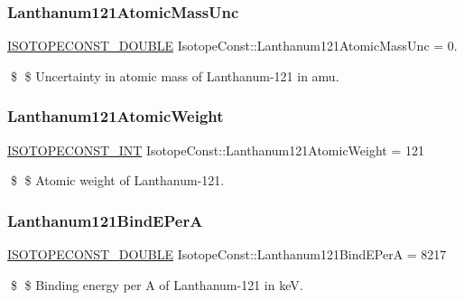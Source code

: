 \subsubsection{\texorpdfstring{Lanthanum121\+Atomic\+Mass\+Unc}{Lanthanum121AtomicMassUnc}}
{\footnotesize\ttfamily \mbox{\hyperlink{group___isotope_const-_macros_ga8f45a7272ce02c0b4c65c44636ed719a}{I\+S\+O\+T\+O\+P\+E\+C\+O\+N\+S\+T\+\_\+\+D\+O\+U\+B\+LE}} Isotope\+Const\+::\+Lanthanum121\+Atomic\+Mass\+Unc = 0.}

\$ \$ Uncertainty in atomic mass of Lanthanum-\/121 in amu. \mbox{\label{group___isotope_const-_lanthanum-_la121_ga6073538565a2f0c3d337176f157a3354}} 
\subsubsection{\texorpdfstring{Lanthanum121\+Atomic\+Weight}{Lanthanum121AtomicWeight}}
{\footnotesize\ttfamily \mbox{\hyperlink{group___isotope_const-_macros_ga5f18360b3e99483a35c32d789e62621c}{I\+S\+O\+T\+O\+P\+E\+C\+O\+N\+S\+T\+\_\+\+I\+NT}} Isotope\+Const\+::\+Lanthanum121\+Atomic\+Weight = 121}

\$ \$ Atomic weight of Lanthanum-\/121. \mbox{\label{group___isotope_const-_lanthanum-_la121_ga3a7640dca12cb66bac75454f232088c0}} 
\subsubsection{\texorpdfstring{Lanthanum121\+Bind\+E\+PerA}{Lanthanum121BindEPerA}}
{\footnotesize\ttfamily \mbox{\hyperlink{group___isotope_const-_macros_ga8f45a7272ce02c0b4c65c44636ed719a}{I\+S\+O\+T\+O\+P\+E\+C\+O\+N\+S\+T\+\_\+\+D\+O\+U\+B\+LE}} Isotope\+Const\+::\+Lanthanum121\+Bind\+E\+PerA = 8217}

\$ \$ Binding energy per A of Lanthanum-\/121 in keV. \mbox{\label{group___isotope_const-_lanthanum-_la121_ga0a6059e739011d3006a2167662514d92}} 
